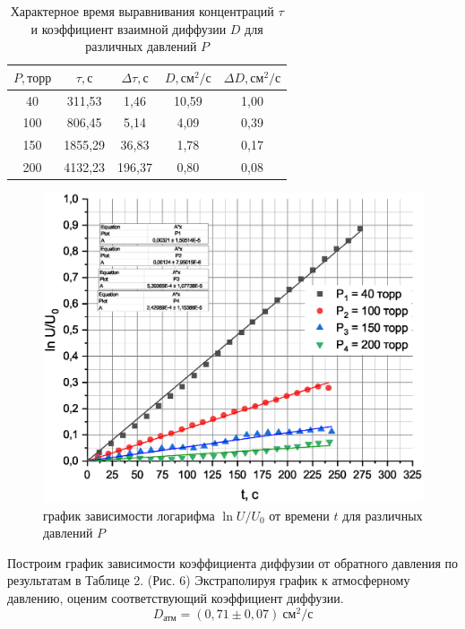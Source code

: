 \documentclass[a4paper,12pt]{article}
\theoremstyle{plain} %
\theoremstyle{definition} %
\theoremstyle{remark} %
\begin{document}
\begin{table}[H]
	\begin{center}
	\begin{tabular}{|c|c|c|c|c|}
		\hline
		$P, \text{торр}$   & $\tau, \text{с}$       & $\Delta \tau, \text{с}$      & $D, \text{см}^2/\text{с}$     & $\Delta D, \text{см}^2/\text{с}$    \\ \hline
		40  & 311,53  & 1,46   & 10,59 & 1,00 \\ \hline
		100 & 806,45  & 5,14   & 4,09  & 0,39 \\ \hline
		150 & 1855,29 & 36,83  & 1,78  & 0,17 \\ \hline
		200 & 4132,23 & 196,37 & 0,80  & 0,08 \\ \hline
	\end{tabular}
\caption{Характерное время выравнивания концентраций $\tau$ и коэффициент взаимной диффузии $D$ для различных давлений $P$}
\end{center}
\end{table}

\begin{figure}[H]
	\begin{center}
		\includegraphics[width=\linewidth]{6}
		\caption{ график зависимости логарифма $\ln U/U_0$ от времени $t$ для различных давлений $P$}
	\end{center}
\end{figure}
Построим график зависимости коэффициента диффузии от обратного давления по результатам в Таблице 2. (Рис. 6) Экстраполируя график к атмосферному давлению, оценим соответствующий коэффициент диффузии.
\[D_\text{атм} = (0,71\pm0,07)\ \text{см}^2/\text{с}\]
\end{document}
